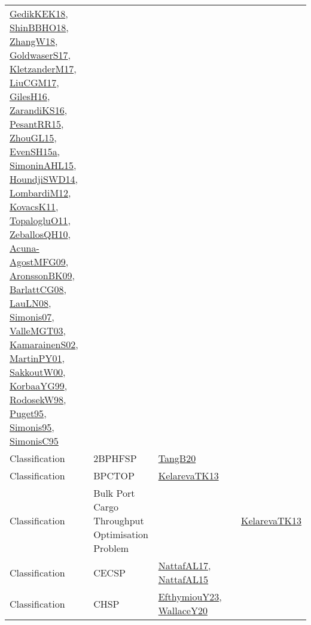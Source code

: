 {\begin{longtable}{lp{3cm}>{\raggedright}p{6cm}>{\raggedright}p{6cm}p{8cm}}
\href{articles/GedikKEK18.pdf}{GedikKEK18}\cite{GedikKEK18}, \href{articles/ShinBBHO18.pdf}{ShinBBHO18}\cite{ShinBBHO18}, \href{articles/ZhangW18.pdf}{ZhangW18}\cite{ZhangW18}, \href{papers/GoldwaserS17.pdf}{GoldwaserS17}\cite{GoldwaserS17}, \href{papers/KletzanderM17.pdf}{KletzanderM17}\cite{KletzanderM17}, \href{papers/LiuCGM17.pdf}{LiuCGM17}\cite{LiuCGM17}, \href{papers/GilesH16.pdf}{GilesH16}\cite{GilesH16}, \href{articles/ZarandiKS16.pdf}{ZarandiKS16}\cite{ZarandiKS16}, \href{papers/PesantRR15.pdf}{PesantRR15}\cite{PesantRR15}, \href{papers/ZhouGL15.pdf}{ZhouGL15}\cite{ZhouGL15}, \href{articles/EvenSH15a.pdf}{EvenSH15a}\cite{EvenSH15a}, \href{articles/SimoninAHL15.pdf}{SimoninAHL15}\cite{SimoninAHL15}, \href{papers/HoundjiSWD14.pdf}{HoundjiSWD14}\cite{HoundjiSWD14}, \href{articles/LombardiM12.pdf}{LombardiM12}\cite{LombardiM12}, \href{articles/KovacsK11.pdf}{KovacsK11}\cite{KovacsK11}, \href{articles/TopalogluO11.pdf}{TopalogluO11}\cite{TopalogluO11}, \href{articles/ZeballosQH10.pdf}{ZeballosQH10}\cite{ZeballosQH10}, \href{papers/Acuna-AgostMFG09.pdf}{Acuna-AgostMFG09}\cite{Acuna-AgostMFG09}, \href{papers/AronssonBK09.pdf}{AronssonBK09}\cite{AronssonBK09}, \href{papers/BarlattCG08.pdf}{BarlattCG08}\cite{BarlattCG08}, \href{papers/LauLN08.pdf}{LauLN08}\cite{LauLN08}, \href{articles/Simonis07.pdf}{Simonis07}\cite{Simonis07}, \href{papers/ValleMGT03.pdf}{ValleMGT03}\cite{ValleMGT03}, \href{papers/KamarainenS02.pdf}{KamarainenS02}\cite{KamarainenS02}, \href{articles/MartinPY01.pdf}{MartinPY01}\cite{MartinPY01}, \href{articles/SakkoutW00.pdf}{SakkoutW00}\cite{SakkoutW00}, \href{papers/KorbaaYG99.pdf}{KorbaaYG99}\cite{KorbaaYG99}, \href{papers/RodosekW98.pdf}{RodosekW98}\cite{RodosekW98}, \href{papers/Puget95.pdf}{Puget95}\cite{Puget95}, \href{papers/Simonis95.pdf}{Simonis95}\cite{Simonis95}, \href{papers/SimonisC95.pdf}{SimonisC95}\cite{SimonisC95}\\
Classification & 2BPHFSP & \href{papers/TangB20.pdf}{TangB20}\cite{TangB20} &  & \\
Classification & BPCTOP & \href{papers/KelarevaTK13.pdf}{KelarevaTK13}\cite{KelarevaTK13} &  & \\
Classification & Bulk Port Cargo Throughput Optimisation Problem &  &  & \href{papers/KelarevaTK13.pdf}{KelarevaTK13}\cite{KelarevaTK13}\\
Classification & CECSP & \href{articles/NattafAL17.pdf}{NattafAL17}\cite{NattafAL17}, \href{articles/NattafAL15.pdf}{NattafAL15}\cite{NattafAL15} &  & \\
Classification & CHSP & \href{papers/EfthymiouY23.pdf}{EfthymiouY23}\cite{EfthymiouY23}, \href{articles/WallaceY20.pdf}{WallaceY20}\cite{WallaceY20} &  & \\

\end{longtable}}
